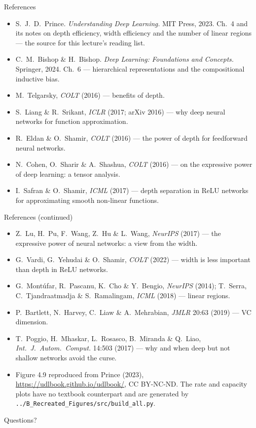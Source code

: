 \documentclass[aspectratio=169, 11pt]{beamer}
\newcommand{\nosrc}{}       %
\begin{document}
\begin{frame}{References}
  \nosrc
  \scriptsize
  \begin{itemize}\setlength{\itemsep}{1pt}
    \item S.~J.~D.~Prince. \textit{Understanding Deep Learning.}
          MIT Press, 2023. Ch.~4 and its notes on depth efficiency,
          width efficiency and the number of linear regions --- the
          source for this lecture's reading list.
    \item C.~M.~Bishop \& H.~Bishop. \textit{Deep Learning: Foundations
          and Concepts.} Springer, 2024. Ch.~6 --- hierarchical
          representations and the compositional inductive bias.
    \item M.~Telgarsky, \textit{COLT} (2016) --- benefits of depth.
    \item S.~Liang \& R.~Srikant, \textit{ICLR} (2017; arXiv 2016) ---
          why deep neural networks for function approximation.
    \item R.~Eldan \& O.~Shamir, \textit{COLT} (2016) --- the power of
          depth for feedforward neural networks.
    \item N.~Cohen, O.~Sharir \& A.~Shashua, \textit{COLT} (2016) ---
          on the expressive power of deep learning: a tensor analysis.
    \item I.~Safran \& O.~Shamir, \textit{ICML} (2017) --- depth
          separation in ReLU networks for approximating smooth
          non-linear functions.
  \end{itemize}
\end{frame}

\begin{frame}{References (continued)}
  \nosrc
  \scriptsize
  \begin{itemize}\setlength{\itemsep}{1pt}
    \item Z.~Lu, H.~Pu, F.~Wang, Z.~Hu \& L.~Wang, \textit{NeurIPS}
          (2017) --- the expressive power of neural networks: a view
          from the width.
    \item G.~Vardi, G.~Yehudai \& O.~Shamir, \textit{COLT} (2022) ---
          width is less important than depth in ReLU networks.
    \item G.~Mont\'ufar, R.~Pascanu, K.~Cho \& Y.~Bengio,
          \textit{NeurIPS} (2014); T.~Serra, C.~Tjandraatmadja \&
          S.~Ramalingam, \textit{ICML} (2018) --- linear regions.
    \item P.~Bartlett, N.~Harvey, C.~Liaw \& A.~Mehrabian,
          \textit{JMLR} 20:63 (2019) --- VC dimension.
    \item T.~Poggio, H.~Mhaskar, L.~Rosasco, B.~Miranda \& Q.~Liao,
          \textit{Int.\ J.\ Autom.\ Comput.} 14:503 (2017) --- why and
          when deep but not shallow networks avoid the curse.
    \item Figure 4.9 reproduced from Prince (2023),
          \url{https://udlbook.github.io/udlbook/}, CC BY-NC-ND. The
          rate and capacity plots have no textbook counterpart and are
          generated by
          \texttt{../B\_Recreated\_Figures/src/build\_all.py}.
  \end{itemize}
\end{frame}

\begin{frame}[standout]
  \nosrc
  Questions?
\end{frame}
\end{document}
